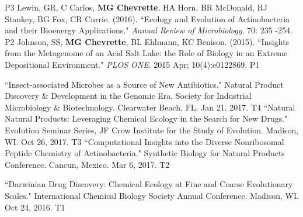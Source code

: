 \begin{cvpubs}
    {P3} %
  \cvpub
    {Lewin, GR, C Carlos, \textbf{MG Chevrette}, HA Horn, BR McDonald, RJ Stankey, BG Fox, CR Currie. (2016). ``Ecology and Evolution of Actinobacteria and their Bioenergy Applications." \textit{Annual Review of Microbiology}. 70: 235 -254. \textit{} } %
    {P2} %
  \cvpub
    {Johnson, SS, \textbf{MG Chevrette}, BL Ehlmann, KC Benison. (2015). ``Insights from the Metagenome of an Acid Salt Lake: the Role of Biology in an Extreme Depositional Environment."  \textit{PLOS ONE}. 2015 Apr; 10(4):e0122869. \textit{} } %
    {P1} %
\end{cvpubs}


\begin{cvpubs}
  \cvpub
    {``Insect-associated Microbes as a Source of New Antibiotics." Natural Product Discovery \& Development in the Genomic Era, Society for Industrial Microbiology \& Biotechnology. Clearwater Beach, FL. Jan 21, 2017.} %
    {T4} %
  \cvpub
    {``Natural Natural Products: Leveraging Chemical Ecology in the Search for New Drugs." Evolution Seminar Series, JF Crow Institute for the Study of Evolution. Madison, WI. Oct 26, 2017.} %
    {T3} %
  \cvpub
    {``Computational Insights into the Diverse Nonribosomal Peptide Chemistry of Actinobacteria." Synthetic Biology for Natural Products Conference. Cancun, Mexico. Mar 6, 2017.} %
    {T2} %
\end{cvpubs}
\begin{cvpubs}
  \cvpub
    {``Darwinian Drug Discovery: Chemical Ecology at Fine and Coarse Evolutionary Scales." International Chemical Biology Society Annual Conference. Madison, WI. Oct 24, 2016.} %
    {T1} %
\end{cvpubs}


